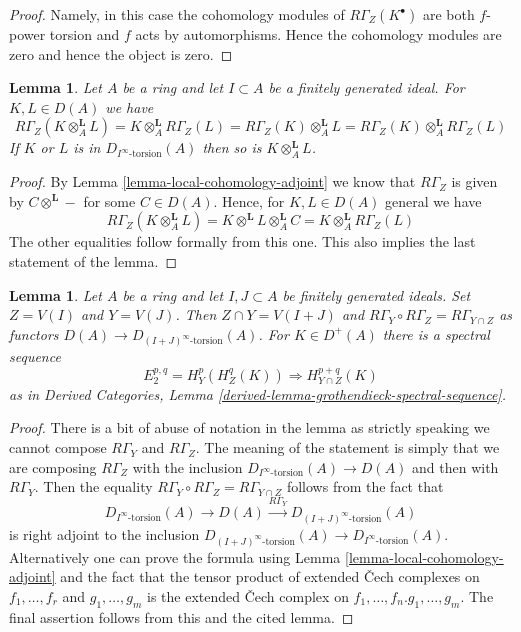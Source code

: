 \documentclass{stacks-project}
\theoremstyle{plain}
\newtheorem{lemma}[subsection]{Lemma}
\theoremstyle{definition}
\theoremstyle{remark}
\numberwithin{equation}{subsection}
\begin{document}
\begin{proof}
Namely, in this case the cohomology modules of $R\Gamma_Z(K^\bullet)$
are both $f$-power torsion and $f$ acts by automorphisms. Hence the
cohomology modules are zero and hence the object is zero.
\end{proof}

\begin{lemma}
\label{lemma-torsion-tensor-product}
Let $A$ be a ring and let $I \subset A$ be a finitely generated ideal.
For $K, L \in D(A)$ we have
$$
R\Gamma_Z(K \otimes_A^\mathbf{L} L) =
K \otimes_A^\mathbf{L} R\Gamma_Z(L) =
R\Gamma_Z(K) \otimes_A^\mathbf{L} L =
R\Gamma_Z(K) \otimes_A^\mathbf{L} R\Gamma_Z(L)
$$
If $K$ or $L$ is in $D_{I^\infty\text{-torsion}}(A)$ then so is
$K \otimes_A^\mathbf{L} L$.
\end{lemma}

\begin{proof}
By Lemma \ref{lemma-local-cohomology-adjoint} we know that
$R\Gamma_Z$ is given by $C \otimes^\mathbf{L} -$ for some $C \in D(A)$.
Hence, for $K, L \in D(A)$ general we have
$$
R\Gamma_Z(K \otimes_A^\mathbf{L} L) =
K \otimes^\mathbf{L} L \otimes_A^\mathbf{L} C =
K \otimes_A^\mathbf{L} R\Gamma_Z(L)
$$
The other equalities follow formally from this one. This also implies
the last statement of the lemma.
\end{proof}

\begin{lemma}
\label{lemma-local-cohomology-ss}
Let $A$ be a ring and let $I, J \subset A$ be finitely generated
ideals. Set $Z = V(I)$ and $Y = V(J)$. Then $Z \cap Y = V(I + J)$
and $R\Gamma_Y \circ R\Gamma_Z = R\Gamma_{Y \cap Z}$ as functors
$D(A) \to D_{(I + J)^\infty\text{-torsion}}(A)$. For $K \in D^+(A)$
there is a spectral sequence
$$
E_2^{p, q} = H^p_Y(H^q_Z(K)) \Rightarrow H^{p + q}_{Y \cap Z}(K)
$$
as in Derived Categories, Lemma
\ref{derived-lemma-grothendieck-spectral-sequence}.
\end{lemma}

\begin{proof}
There is a bit of abuse of notation in the lemma as strictly
speaking we cannot compose $R\Gamma_Y$ and $R\Gamma_Z$. The
meaning of the statement is simply that we are composing
$R\Gamma_Z$ with the inclusion $D_{I^\infty\text{-torsion}}(A) \to D(A)$
and then with $R\Gamma_Y$. Then the equality
$R\Gamma_Y \circ R\Gamma_Z = R\Gamma_{Y \cap Z}$
follows from the fact that
$$
D_{I^\infty\text{-torsion}}(A) \to D(A) \xrightarrow{R\Gamma_Y}
D_{(I + J)^\infty\text{-torsion}}(A)
$$
is right adjoint to the inclusion
$D_{(I + J)^\infty\text{-torsion}}(A) \to D_{I^\infty\text{-torsion}}(A)$.
Alternatively one can prove the formula using
Lemma \ref{lemma-local-cohomology-adjoint}
and the fact that the tensor product of
extended {\v C}ech complexes on $f_1, \ldots, f_r$ and
$g_1, \ldots, g_m$ is the extended {\v C}ech complex on
$f_1, \ldots, f_n. g_1, \ldots, g_m$.
The final assertion follows from this and the cited lemma.
\end{proof}
\end{document}
